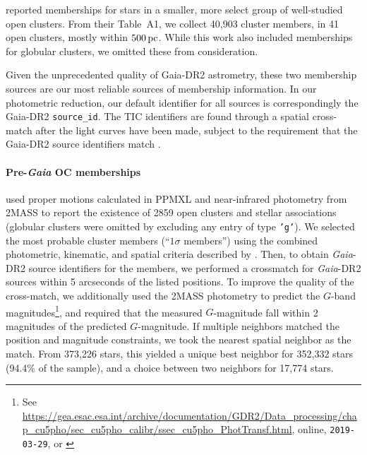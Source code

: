 \documentclass[12pt,twocolumn,tighten]{aastex62}
\begin{document}
\citet{gaia_hr_2018} reported memberships for stars in a smaller, more
select group of well-studied open clusters. From their Table~A1, we
collect 40{,}903 cluster members, in 41 open clusters, mostly within
$500\,{\rm pc}$. While this work also included memberships for
globular clusters, we omitted these from consideration.

Given the unprecedented quality of Gaia-DR2 astrometry, these two
membership sources are our most reliable sources of membership
information.  In our photometric reduction,  our default identifier
for all sources is correspondingly the Gaia-DR2 \texttt{source\_id}.
The TIC identifiers are found through a spatial cross-match after the
light curves have been made, subject to the requirement that the
Gaia-DR2 source identifiers match
\citep{stassun_TIC_2018,stassun_TIC8_2019}.  




\paragraph{Pre-{\it Gaia} OC memberships}
\citet{Kharchenko_et_al_2013} used proper motions calculated in PPMXL
\citep[][a combination of USNO-B1{.}0 and 2MASS
astrometry]{roeser_ppmxl_2010} and near-infrared photometry from 2MASS
\citep{skrutskie_tmass_2006} to report the existence of 2859 open
clusters and stellar associations (globular clusters were omitted by
excluding any entry of type \texttt{'g'}).  We selected the most
probable cluster members (``$1\sigma$ members'') using the combined
photometric, kinematic, and spatial criteria described by
\citet[][Section~3.3]{kharchenko_global_2012}.  Then, to obtain {\it
Gaia}-DR2 source identifiers for the members, we performed a
crossmatch for {\it Gaia}-DR2 sources within 5 arcseconds of the
listed positions.  To improve the quality of the cross-match, we
additionally used the 2MASS photometry to predict the $G$-band
magnitudes\footnote{See
\url{https://gea.esac.esa.int/archive/documentation/GDR2/Data_processing/chap_cu5pho/sec_cu5pho_calibr/ssec_cu5pho_PhotTransf.html},
online, \texttt{2019-03-29}, or \citet{carrasco_gaia_2016}}, and
required that the measured $G$-magnitude fall within 2 magnitudes of
the predicted $G$-magnitude.  If multiple neighbors matched the
position and magnitude constraints, we took the nearest spatial
neighbor as the match.  From 373{,}226 stars, this yielded a unique
best neighbor for 352{,}332 stars (94.4\% of the sample), and a choice
between two neighbors for 17{,}774 stars. 
\end{document}
